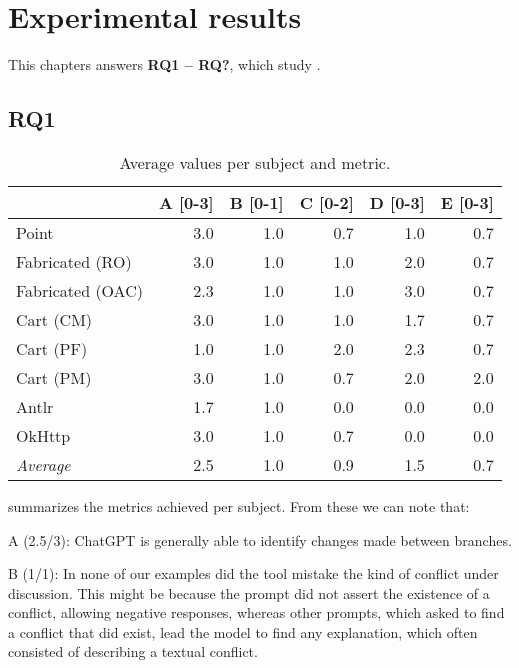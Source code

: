     \chapter{Experimental results}\label{chap:results}

This chapters answers \textbf{RQ1 – RQ?}, which study .

\section{RQ1}\label{sec:results:rq1}

\begin{table}[t]
\centering
\begin{tabular}{@{\extracolsep{\fill}} lrrrrr} \toprule
                 & A [0-3] & B [0-1] & C [0-2] & D [0-3] & E [0-3] \\
\midrule
Point            & 3.0 & 1.0 & 0.7 & 1.0 & 0.7 \\
Fabricated (RO)  & 3.0 & 1.0 & 1.0 & 2.0 & 0.7 \\
Fabricated (OAC) & 2.3 & 1.0 & 1.0 & 3.0 & 0.7 \\
Cart (CM)        & 3.0 & 1.0 & 1.0 & 1.7 & 0.7 \\
Cart (PF)        & 1.0 & 1.0 & 2.0 & 2.3 & 0.7 \\
Cart (PM)        & 3.0 & 1.0 & 0.7 & 2.0 & 2.0 \\
Antlr            & 1.7 & 1.0 & 0.0 & 0.0 & 0.0 \\
OkHttp           & 3.0 & 1.0 & 0.7 & 0.0 & 0.0 \\
\midrule
\textit{Average}  & 2.5 & 1.0 & 0.9 & 1.5 & 0.7 \\
\bottomrule
\end{tabular}
\caption{Average values per subject and metric.\label{tab:results:rq1}}
\end{table}

 summarizes the metrics achieved per subject. From these we can note that:

A (2.5/3): ChatGPT is generally able to identify changes made between branches.

B (1/1): In none of our examples did the tool mistake the kind of conflict under discussion. This might be because the prompt did not assert the existence of a conflict, allowing negative responses, whereas other prompts, which asked to find a conflict that did exist, lead the model to find any explanation, which often consisted of describing a textual conflict.

